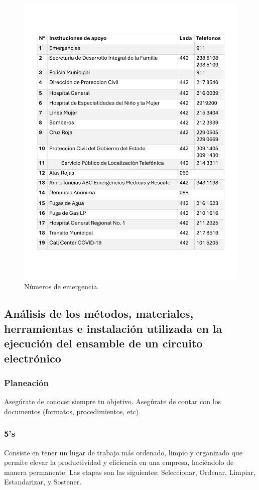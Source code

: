 \begin{figure}[H]
    \centering
    \includegraphics[scale=0.35]{15/img/tablaDirectorioEmergencias.pdf}
    \caption{Números de emergencia.}
    \label{fig:tablaDirectorioEmergencias}
\end{figure}
%

\subsection{Análisis de los métodos, materiales, herramientas e instalación utilizada en la ejecución del ensamble de un circuito electrónico}
% 
\subsubsection{Planeación}

Asegúrate de conocer siempre tu objetivo.
Asegúrate de contar con los documentos (formatos, procedimientos, etc).
% 
% 
\subsubsection{5's}
% 
Consiste en tener un lugar de trabajo
más ordenado, limpio y organizado que
permite elevar la productividad y
eficiencia en una empresa, haciéndolo de manera permanente.
Las etapas son las siguientes: Seleccionar, Ordenar, Limpiar, Estandarizar, y Sostener.
% 
